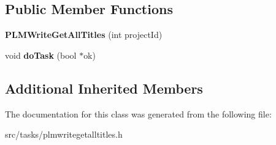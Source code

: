 \subsection*{Public Member Functions}
\begin{DoxyCompactItemize}
\item 
{\bfseries P\+L\+M\+Write\+Get\+All\+Titles} (int project\+Id)\hypertarget{class_p_l_m_write_get_all_titles_a7f18199918100a2ffa04bace3cef3449}{}\label{class_p_l_m_write_get_all_titles_a7f18199918100a2ffa04bace3cef3449}

\item 
void {\bfseries do\+Task} (bool $\ast$ok)\hypertarget{class_p_l_m_write_get_all_titles_a63d03562536c5b3d5db8cb695eeb6b5e}{}\label{class_p_l_m_write_get_all_titles_a63d03562536c5b3d5db8cb695eeb6b5e}

\end{DoxyCompactItemize}
\subsection*{Additional Inherited Members}


The documentation for this class was generated from the following file\+:\begin{DoxyCompactItemize}
\item 
src/tasks/plmwritegetalltitles.\+h\end{DoxyCompactItemize}
